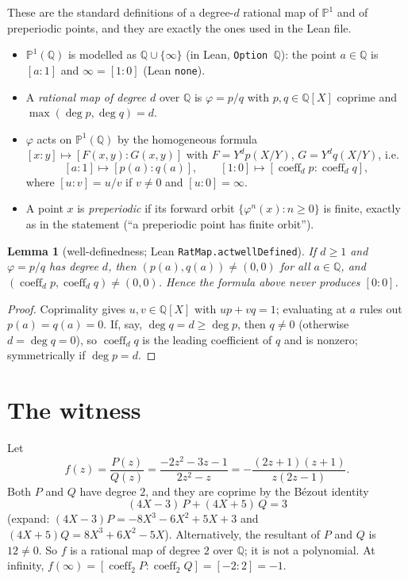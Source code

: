 \documentclass[11pt]{article}
\newtheorem{lemma}[theorem]{Lemma}
\theoremstyle{definition}
\theoremstyle{remark}
\renewcommand{\_}{\oldus\allowbreak}
\newcommand{\PP}{\mathbb{P}^1(\mathbb{Q})}
\newcommand{\Q}{\mathbb{Q}}
\begin{document}
These are the standard definitions of a degree-$d$ rational map of $\mathbb P^1$ and of preperiodic
points, and they are exactly the ones used in the Lean file.

\begin{itemize}
  \item $\PP$ is modelled as $\Q\cup\{\infty\}$ (in Lean, \texttt{Option $\mathbb{Q}$}): the point $a\in\Q$
        is $[a:1]$ and $\infty = [1:0]$ (Lean \texttt{none}).
  \item A \emph{rational map of degree $d$} over $\Q$ is $\varphi = p/q$ with $p,q\in\Q[X]$ coprime and
        $\max(\deg p,\deg q) = d$.
  \item $\varphi$ acts on $\PP$ by the homogeneous formula $[x:y]\mapsto [F(x,y):G(x,y)]$ with
        $F = Y^d p(X/Y)$, $G = Y^d q(X/Y)$, i.e.
        \[
          [a:1] \mapsto [p(a):q(a)], \qquad [1:0]\mapsto [\operatorname{coeff}_d p : \operatorname{coeff}_d q],
        \]
        where $[u:v] = u/v$ if $v\ne 0$ and $[u:0]=\infty$.
  \item A point $x$ is \emph{preperiodic} if its forward orbit $\{\varphi^n(x) : n\ge 0\}$ is finite,
        exactly as in the statement (``a preperiodic point has finite orbit'').
\end{itemize}

\begin{lemma}[well-definedness; Lean \texttt{RatMap.act\_wellDefined}]
If $d\ge 1$ and $\varphi = p/q$ has degree $d$, then $(p(a),q(a))\ne(0,0)$ for all $a\in\Q$, and
$(\operatorname{coeff}_d p,\operatorname{coeff}_d q)\ne(0,0)$. Hence the formula above never produces
$[0:0]$.
\end{lemma}

\begin{proof}
Coprimality gives $u,v\in\Q[X]$ with $up+vq=1$; evaluating at $a$ rules out $p(a)=q(a)=0$. If, say,
$\deg q = d \ge \deg p$, then $q\ne 0$ (otherwise $d = \deg q = 0$), so $\operatorname{coeff}_d q$ is the
leading coefficient of $q$ and is nonzero; symmetrically if $\deg p = d$.
\end{proof}

\section{The witness}

Let
\[
  f(z) = \frac{P(z)}{Q(z)} = \frac{-2z^2-3z-1}{2z^2-z} = -\frac{(2z+1)(z+1)}{z(2z-1)}.
\]
Both $P$ and $Q$ have degree $2$, and they are coprime by the B\'ezout identity
\[
  (4X-3)\,P + (4X+5)\,Q = 3
\]
(expand: $(4X-3)P = -8X^3-6X^2+5X+3$ and $(4X+5)Q = 8X^3+6X^2-5X$). Alternatively, the resultant of $P$ and
$Q$ is $12\ne 0$. So $f$ is a rational map of degree $2$ over $\Q$; it is not a polynomial. At infinity,
$f(\infty) = [\operatorname{coeff}_2 P : \operatorname{coeff}_2 Q] = [-2:2] = -1$.
\end{document}
